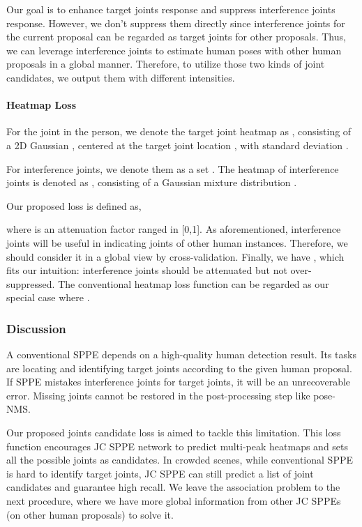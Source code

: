\documentclass[10pt,twocolumn,letterpaper]{article}
\begin{document}
Our goal is to enhance target joints response and suppress interference joints response. However, we don't suppress them directly since interference joints for the current proposal can be regarded as target joints for other proposals. Thus, we can leverage interference joints to estimate human poses with other human proposals in a global manner. Therefore, to utilize those two kinds of joint candidates, we output them with different intensities. 

\vspace{-0.1in}
\paragraph{Heatmap Loss} For the  joint in the  person, we denote the target joint heatmap as , consisting of a 2D Gaussian , centered at the target joint location , with standard deviation .

For interference joints, we denote them as a set . The heatmap of interference joints is denoted as , consisting of a Gaussian mixture distribution .

Our proposed loss is defined as,

where  is an attenuation factor ranged in [0,1]. As aforementioned, interference joints will be useful in indicating joints of other human instances. Therefore, we should consider it in a global view by cross-validation. Finally, we have , which fits our intuition: interference joints should be attenuated but not over-suppressed. The conventional heatmap loss function can be regarded as our special case where .  

\vspace{-0.1in}
\subsubsection{Discussion}
A conventional SPPE depends on a high-quality human detection result. Its tasks are locating and identifying target joints according to the given human proposal. If SPPE mistakes interference joints for target joints, it will be an unrecoverable error. Missing joints cannot be restored in the post-processing step like pose-NMS.

Our proposed joints candidate loss is aimed to tackle this limitation. This loss function encourages JC SPPE network to predict multi-peak heatmaps and sets all the possible joints as candidates. In crowded scenes, while conventional SPPE is hard to identify target joints, JC SPPE can still predict a list of joint candidates and guarantee high recall. We leave the association problem to the next procedure, where we have more global information from other JC SPPEs (on other human proposals) to solve it.
\end{document}
